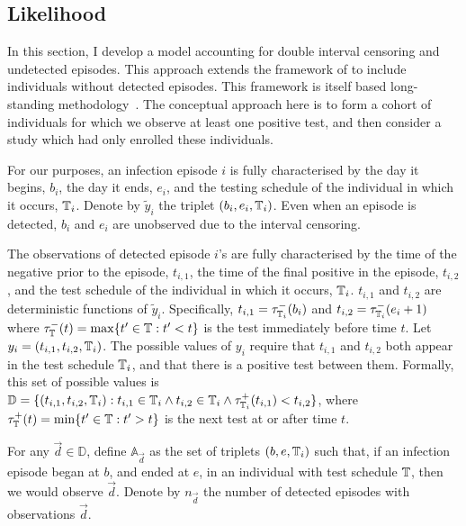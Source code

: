 \documentclass[thesis.tex]{subfiles}
\begin{document}
\subsection{Likelihood}\label{perf-test:sec:likelihood}

In this section, I develop a model accounting for double interval censoring and undetected episodes.
This approach extends the framework of \textcite{heiseyModelling} to include individuals without detected episodes.
This framework is itself based long-standing methodology~\autocites{dempsterMaximum}{turnbullEmpirical}.
The conceptual approach here is to form a cohort of individuals for which we observe at least one positive test, and then consider a study which had only enrolled these individuals.


For our purposes, an infection episode $i$ is fully characterised by the day it begins, $b_i$, the day it ends, $e_i$, and the testing schedule of the individual in which it occurs, $\mathbb{T}_i$.
Denote by $\tilde{y}_i$ the triplet $(b_i, e_i, \mathbb{T}_i)$.
Even when an episode is detected, $b_i$ and $e_i$ are unobserved due to the interval censoring.

The observations of detected episode $i$'s are fully characterised by the time of the negative prior to the episode, $t_{i,1}$, the time of the final positive in the episode, $t_{i,2}$, and the test schedule of the individual in which it occurs, $\mathbb{T}_i$.
$t_{i,1}$ and $t_{i,2}$ are deterministic functions of $\tilde{y}_i$.
Specifically, $t_{i,1} = \tau^-_{\mathbb{T}_i}(b_i)$ and $t_{i,2} = \tau^-_{\mathbb{T}_i}(e_i+1)$ where $\tau^-_{\mathbb{T}}(t) = \max \{ t' \in \mathbb{T} : t' < t \}$ is the test immediately before time $t$.
Let $y_i = (t_{i,1}, t_{i,2}, \mathbb{T}_i)$.
The possible values of $y_i$ require that $t_{i,1}$ and $t_{i,2}$ both appear in the test schedule $\mathbb{T}_i$, and that there is a positive test between them.
Formally, this set of possible values is $\mathbb{D} = \{ (t_{i,1}, t_{i,2}, \mathbb{T}_i) : t_{i,1} \in \mathbb{T}_i \wedge t_{i,2} \in \mathbb{T}_i \wedge \tau^+_{\mathbb{T}_i}(t_{i,1}) < t_{i,2} \}$, where $\tau^+_{\mathbb{T}}(t) = \min\{ t' \in \mathbb{T} : t' > t \}$ is the next test at or after time $t$.

For any $\vec{d} \in \mathbb{D}$, define $\mathbb{A}_{\vec{d}}$ as the set of triplets $(b, e, \mathbb{T}_i)$ such that, if an infection episode began at $b$, and ended at $e$, in an individual with test schedule $\mathbb{T}$, then we would observe $\vec{d}$.
Denote by $n_{\vec{d}}$ the number of detected episodes with observations $\vec{d}$.
\end{document}
